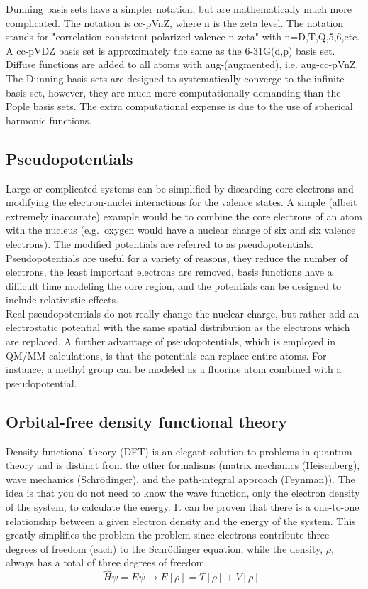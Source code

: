 \documentclass[12pt]{report}
\begin{document}
Dunning basis sets have a simpler notation, but are mathematically much more
complicated.
The notation is cc-pVnZ, where n is the zeta level.
The notation stands for "correlation consistent polarized valence n zeta"
with n=D,T,Q,5,6,etc.
A cc-pVDZ basis set is approximately the same as the 6-31G(d,p) basis set.
Diffuse functions are added to all atoms with aug-(augmented), i.e.
aug-cc-pVnZ.
The Dunning basis sets are designed to systematically converge to the infinite
basis set, however, they are much more computationally demanding than the
Pople basis sets.
The extra computational expense is due to the use of spherical harmonic
functions.

\subsection{Pseudopotentials}

Large or complicated systems can be simplified by discarding core electrons
and modifying the electron-nuclei interactions for the valence states.
A simple (albeit extremely inaccurate) example would be to combine the core
electrons of an atom with the nucleus (e.g.\ oxygen would have a nuclear charge
of six and six valence electrons).
The modified potentials are referred to as pseudopotentials.
Pseudopotentials are useful for a variety of reasons, they reduce the number
of electrons, the least important electrons are removed, basis functions have
a difficult time modeling the core region, and the potentials can be designed
to include relativistic effects. \\

Real pseudopotentials do not really change the nuclear charge, but rather add
an electrostatic potential with the same spatial distribution as the electrons
which are replaced.
A further advantage of pseudopotentials, which is employed in QM/MM
calculations, is that the potentials can replace entire atoms.
For instance, a methyl group can be modeled as a fluorine atom combined with a
pseudopotential.

\subsection{Orbital-free density functional theory}

Density functional theory (DFT) is an elegant solution to problems in quantum
theory and is distinct from the other formalisms (matrix mechanics
(Heisenberg), wave mechanics (Schr\"{o}dinger), and the path-integral approach
(Feynman)).
The idea is that you do not need to know the wave function, only the electron
density of the system, to calculate the energy.
It can be proven that there is a one-to-one relationship between a given
electron density and the energy of the system.
This greatly simplifies the problem the problem since electrons contribute
three degrees of freedom (each) to the Schr\"{o}dinger equation, while the
density, $\rho$, always has a total of three degrees of freedom.
\begin{equation}
 \hat H\psi=E\psi \to E[\rho] = T[\rho]+V[\rho] \; .
\end{equation}
\end{document}
